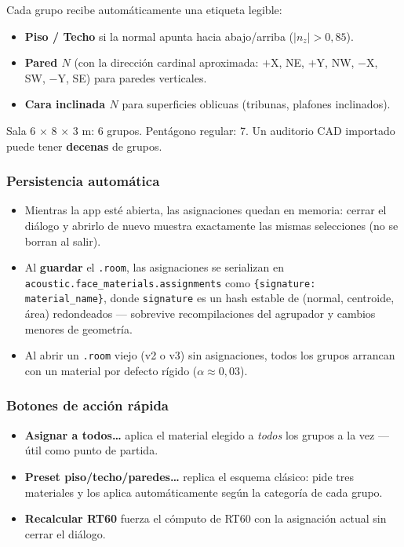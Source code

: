 \documentclass[11pt, a4paper]{article}
\newcommand{\menu}[1]{\textbf{\guillemotleft #1\guillemotright}}
\begin{document}
Cada grupo recibe automáticamente una etiqueta legible:

\begin{itemize}
  \item \textbf{Piso / Techo} si la normal apunta hacia abajo/arriba
        ($\lvert n_z\rvert > 0,\!85$).
  \item \textbf{Pared $N$} (con la dirección cardinal aproximada:
        $+$X, NE, $+$Y, NW, $-$X, SW, $-$Y, SE) para paredes verticales.
  \item \textbf{Cara inclinada $N$} para superficies oblicuas
        (tribunas, plafones inclinados).
\end{itemize}

Sala 6 $\times$ 8 $\times$ 3 m: 6 grupos. Pentágono regular: 7. Un
auditorio CAD importado puede tener \textbf{decenas} de grupos.

\subsubsection*{Persistencia automática}

\begin{itemize}
  \item Mientras la app esté abierta, las asignaciones quedan en
        memoria: cerrar el diálogo y abrirlo de nuevo muestra
        exactamente las mismas selecciones (no se borran al salir).
  \item Al \textbf{guardar} el \texttt{.room}, las asignaciones se
        serializan en \texttt{acoustic.face\_materials.assignments}
        como \texttt{\{signature: material\_name\}}, donde
        \texttt{signature} es un hash estable de
        (normal, centroide, área) redondeados --- sobrevive
        recompilaciones del agrupador y cambios menores de geometría.
  \item Al abrir un \texttt{.room} viejo (v2 o v3) sin asignaciones,
        todos los grupos arrancan con un material por defecto rígido
        ($\alpha \approx 0,\!03$).
\end{itemize}

\subsubsection*{Botones de acción rápida}

\begin{itemize}
  \item \menu{Asignar a todos\ldots} aplica el material elegido a
        \emph{todos} los grupos a la vez --- útil como punto de partida.
  \item \menu{Preset piso/techo/paredes\ldots} replica el esquema
        clásico: pide tres materiales y los aplica automáticamente
        según la categoría de cada grupo.
  \item \menu{Recalcular RT60} fuerza el cómputo de RT60 con la
        asignación actual sin cerrar el diálogo.
\end{itemize}
\end{document}
